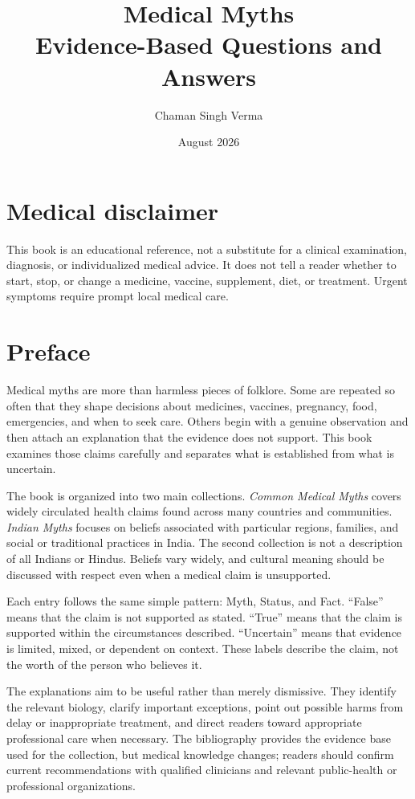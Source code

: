 \documentclass[11pt,oneside]{book}
\title{Medical Myths\\[0.4em]\large Evidence-Based Questions and Answers}
\author{Chaman Singh Verma}
\date{August 2026}
\begin{document}
\frontmatter
\hypersetup{pageanchor=false}
\maketitle
\hypersetup{pageanchor=true}
\chapter*{Medical disclaimer}
{}
This book is an educational reference, not a substitute for a clinical examination, diagnosis, or individualized medical advice. It does not tell a reader whether to start, stop, or change a medicine, vaccine, supplement, diet, or treatment. Urgent symptoms require prompt local medical care.
\chapter*{Preface}
{}
Medical myths are more than harmless pieces of folklore. Some are repeated so often that they shape decisions about medicines, vaccines, pregnancy, food, emergencies, and when to seek care. Others begin with a genuine observation and then attach an explanation that the evidence does not support. This book examines those claims carefully and separates what is established from what is uncertain.

The book is organized into two main collections. \emph{Common Medical Myths} covers widely circulated health claims found across many countries and communities. \emph{Indian Myths} focuses on beliefs associated with particular regions, families, and social or traditional practices in India. The second collection is not a description of all Indians or Hindus. Beliefs vary widely, and cultural meaning should be discussed with respect even when a medical claim is unsupported.

Each entry follows the same simple pattern: Myth, Status, and Fact. ``False'' means that the claim is not supported as stated. ``True'' means that the claim is supported within the circumstances described. ``Uncertain'' means that evidence is limited, mixed, or dependent on context. These labels describe the claim, not the worth of the person who believes it.

The explanations aim to be useful rather than merely dismissive. They identify the relevant biology, clarify important exceptions, point out possible harms from delay or inappropriate treatment, and direct readers toward appropriate professional care when necessary. The bibliography provides the evidence base used for the collection, but medical knowledge changes; readers should confirm current recommendations with qualified clinicians and relevant public-health or professional organizations.
\end{document}
